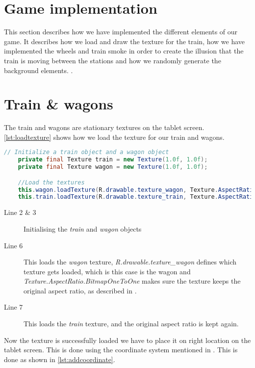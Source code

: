 \section{Game implementation}

This section describes how we have implemented the different elements of our game. It describes how we load and draw the texture for the train, how we have implemented the wheels and train smoke in order to create the illusion that the train is moving between the stations and how we randomly generate the background elements. .

\section{Train \& wagons}

The train and wagons are stationary textures on the tablet screen. \autoref{lst:loadtexture} shows how we load the texture for our train and wagons. 

\begin{lstlisting}[language=java,firstnumber=1,caption={Loading the texture for our train and wagons},label=lst:loadtexture] 
	// Initialize a train object and a wagon object
	private final Texture train = new Texture(1.0f, 1.0f);
	private final Texture wagon = new Texture(1.0f, 1.0f);

	//Load the textures
	this.wagon.loadTexture(R.drawable.texture_wagon, Texture.AspectRatio.BitmapOneToOne);
	this.train.loadTexture(R.drawable.texture_train, Texture.AspectRatio.BitmapOneToOne); 
\end{lstlisting}

\begin{description}
\item[Line 2 \& 3] Initialising the \textit{train} and \textit{wagon} objects 
\item[Line 6] This loads the \textit{wagon} texture, \textit{R.drawable.texture\_wagon} defines which texture gets loaded, which is this case is the wagon and \textit{Texture.AspectRatio.BitmapOneToOne} makes sure the texture keeps the original aspect ratio, as described in .
\item[Line 7] This loads the \textit{train} texture, and the original aspect ratio is kept again. 
\end{description}

Now the texture is successfully loaded we have to place it on right location on the tablet screen. This is done using the coordinate system mentioned in . This is done as shown in \autoref{lst:addcoordinate}.

